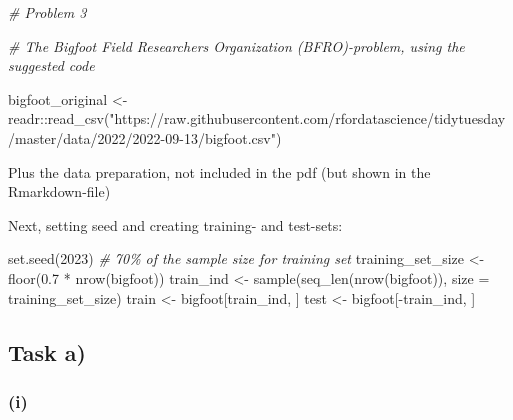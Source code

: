 \documentclass[
]{article}
\newenvironment{Shaded}{\begin{snugshade}}{\end{snugshade}}
\newcommand{\AttributeTok}[1]{\textcolor[rgb]{0.77,0.63,0.00}{#1}}
\newcommand{\CommentTok}[1]{\textcolor[rgb]{0.56,0.35,0.01}{\textit{#1}}}
\newcommand{\DecValTok}[1]{\textcolor[rgb]{0.00,0.00,0.81}{#1}}
\newcommand{\FloatTok}[1]{\textcolor[rgb]{0.00,0.00,0.81}{#1}}
\newcommand{\FunctionTok}[1]{\textcolor[rgb]{0.00,0.00,0.00}{#1}}
\newcommand{\NormalTok}[1]{#1}
\newcommand{\OtherTok}[1]{\textcolor[rgb]{0.56,0.35,0.01}{#1}}
\newcommand{\SpecialCharTok}[1]{\textcolor[rgb]{0.00,0.00,0.00}{#1}}
\newcommand{\StringTok}[1]{\textcolor[rgb]{0.31,0.60,0.02}{#1}}
\begin{document}
\begin{Shaded}
\begin{Highlighting}[]
\CommentTok{\# Problem 3}

\CommentTok{\# The Bigfoot Field Researchers Organization (BFRO){-}problem, using the suggested code}
\end{Highlighting}
\end{Shaded}

\begin{Shaded}
\begin{Highlighting}[]
\NormalTok{bigfoot\_original }\OtherTok{\textless{}{-}}\NormalTok{ readr}\SpecialCharTok{::}\FunctionTok{read\_csv}\NormalTok{(}\StringTok{"https://raw.githubusercontent.com/rfordatascience/tidytuesday/master/data/2022/2022{-}09{-}13/bigfoot.csv"}\NormalTok{)}
\end{Highlighting}
\end{Shaded}

Plus the data preparation, not included in the pdf (but shown in the
Rmarkdown-file)

Next, setting seed and creating training- and test-sets:

\begin{Shaded}
\begin{Highlighting}[]
\FunctionTok{set.seed}\NormalTok{(}\DecValTok{2023}\NormalTok{)}
\CommentTok{\# 70\% of the sample size for training set}
\NormalTok{training\_set\_size }\OtherTok{\textless{}{-}} \FunctionTok{floor}\NormalTok{(}\FloatTok{0.7} \SpecialCharTok{*} \FunctionTok{nrow}\NormalTok{(bigfoot))}
\NormalTok{train\_ind }\OtherTok{\textless{}{-}} \FunctionTok{sample}\NormalTok{(}\FunctionTok{seq\_len}\NormalTok{(}\FunctionTok{nrow}\NormalTok{(bigfoot)), }\AttributeTok{size =}\NormalTok{ training\_set\_size)}
\NormalTok{train }\OtherTok{\textless{}{-}}\NormalTok{ bigfoot[train\_ind, ]}
\NormalTok{test }\OtherTok{\textless{}{-}}\NormalTok{ bigfoot[}\SpecialCharTok{{-}}\NormalTok{train\_ind, ]}
\end{Highlighting}
\end{Shaded}

\hypertarget{task-a}{%
\subsection{Task a)}\label{task-a}}

\hypertarget{i-1}{%
\subsubsection{(i)}\label{i-1}}
\end{document}
